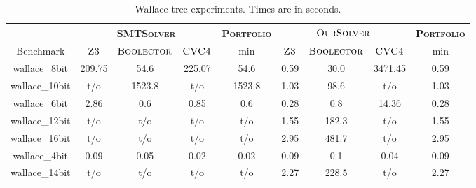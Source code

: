\begin{table}[t]
\centering
\caption{Wallace tree experiments. Times are in seconds.}
\label{my-label}
\begin{tabular}{|c|c|c|c|c|c|c|c|c|}
\hline
               & \multicolumn{3}{c|}{\textsc{SMTSolver}} & \textsc{Portfolio} & \multicolumn{3}{c|}{$\textsc{OurSolver}$}       & \textsc{Portfolio} \\ \hline
Benchmark      & $\textsc{Z3}$   & $\textsc{Boolector}$  & $\textsc{CVC4}$  & min                  & $\textsc{Z3}$ & $\textsc{Boolector}$ & $\textsc{CVC4}$ & min                  \\ \hline
wallace\_8bit  & 209.75      & 54.6          & 225.07      & 54.6                 & 0.59      & 30.0         & 3471.45    & 0.59                 \\ \hline
wallace\_10bit & t/o         & 1523.8        & t/o         & 1523.8               & 1.03      & 98.6         & t/o        & 1.03                 \\ \hline
wallace\_6bit  & 2.86        & 0.6           & 0.85        & 0.6                  & 0.28      & 0.8          & 14.36      & 0.28                 \\ \hline
wallace\_12bit & t/o         & t/o           & t/o         & t/o                  & 1.55      & 182.3        & t/o        & 1.55                 \\ \hline
wallace\_16bit & t/o         & t/o           & t/o         & t/o                  & 2.95      & 481.7        & t/o        & 2.95                 \\ \hline
wallace\_4bit  & 0.09        & 0.05          & 0.02        & 0.02                 & 0.09      & 0.1          & 0.04       & 0.09                 \\ \hline
wallace\_14bit & t/o         & t/o           & t/o         & t/o                  & 2.27      & 228.5        & t/o        & 2.27                 \\ \hline
\end{tabular}
\end{table}
